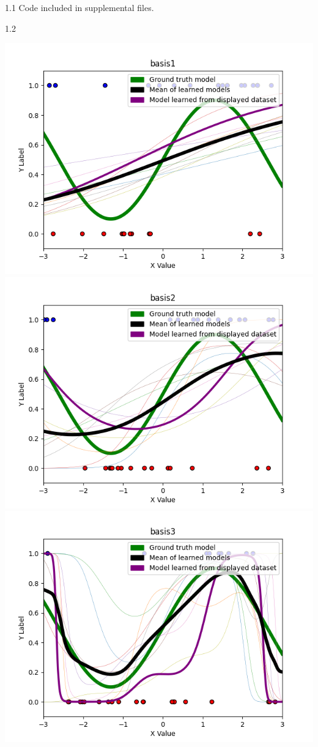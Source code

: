 \documentclass[submit]{harvardml}
\begin{document}
1.1 Code included in supplemental files.

1.2

\begin{center}
    \includegraphics[scale=0.7]{basis1.png}\\ \includegraphics[scale=0.7]{basis2.png}\\
    \includegraphics[scale=0.7]{basis3.png}
\end{center}
\end{document}
